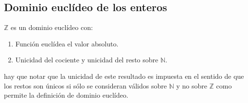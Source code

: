 \subsection{Dominio euclídeo de los enteros}

\begin{theorem}
$\mathbb{Z}$ es un dominio euclídeo con:
	
\begin{enumerate}
\item Función euclídea el valor absoluto. 
\item Unicidad del cociente y unicidad  del resto sobre $\mathbb{N}$. 
\end{enumerate} 
	
hay que notar que la unicidad de este resultado es impuesta en el sentido de que los restos son únicos si sólo se consideran válidos sobre $\mathbb{N}$ y no sobre $\mathbb{Z}$ como permite la definición de dominio euclídeo. 
\end{theorem}
